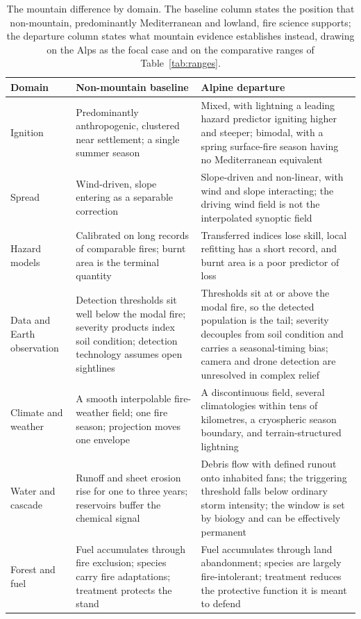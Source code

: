 \documentclass[11pt,a4paper]{article}
\begin{document}
\begin{table}[H]
\centering
\small
\setlength{\tabcolsep}{4pt}
\renewcommand{\arraystretch}{1.15}
\caption{The mountain difference by domain. The baseline column states the position that non-mountain, predominantly Mediterranean and lowland, fire science supports; the departure column states what mountain evidence establishes instead, drawing on the Alps as the focal case and on the comparative ranges of Table~\ref{tab:ranges}.}
\label{tab:contrast}
\begin{tabularx}{\textwidth}{@{}p{2.1cm} X X@{}}
\toprule
\textbf{Domain} & \textbf{Non-mountain baseline} & \textbf{Alpine departure} \\
\midrule
Ignition & Predominantly anthropogenic, clustered near settlement; a single summer season & Mixed, with lightning a leading hazard predictor igniting higher and steeper; bimodal, with a spring surface-fire season having no Mediterranean equivalent \\
Spread & Wind-driven, slope entering as a separable correction & Slope-driven and non-linear, with wind and slope interacting; the driving wind field is not the interpolated synoptic field \\
Hazard models & Calibrated on long records of comparable fires; burnt area is the terminal quantity & Transferred indices lose skill, local refitting has a short record, and burnt area is a poor predictor of loss \\
Data and Earth observation & Detection thresholds sit well below the modal fire; severity products index soil condition; detection technology assumes open sightlines & Thresholds sit at or above the modal fire, so the detected population is the tail; severity decouples from soil condition and carries a seasonal-timing bias; camera and drone detection are unresolved in complex relief \\
Climate and weather & A smooth interpolable fire-weather field; one fire season; projection moves one envelope & A discontinuous field, several climatologies within tens of kilometres, a cryospheric season boundary, and terrain-structured lightning \\
Water and cascade & Runoff and sheet erosion rise for one to three years; reservoirs buffer the chemical signal & Debris flow with defined runout onto inhabited fans; the triggering threshold falls below ordinary storm intensity; the window is set by biology and can be effectively permanent \\
Forest and fuel & Fuel accumulates through fire exclusion; species carry fire adaptations; treatment protects the stand & Fuel accumulates through land abandonment; species are largely fire-intolerant; treatment reduces the protective function it is meant to defend \\

\end{tabularx}
\end{table}
\end{document}
